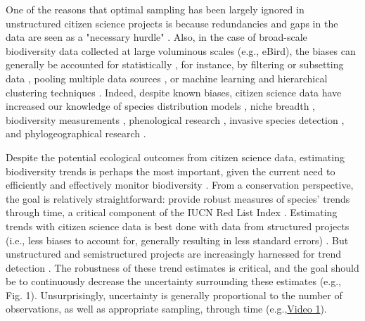 \documentclass[9pt,twocolumn,twoside,lineno]{pnas-new}
\begin{document}
One of the reasons that optimal sampling has been largely ignored in unstructured citizen science projects is because redundancies and gaps in the data are seen as a "necessary hurdle" \cite{parrish2018exposing}. Also, in the case of broad-scale biodiversity data collected at large voluminous scales (e.g., eBird), the biases can generally be accounted for statistically \cite{isaac2014statistics, robinson2018correcting}, for instance, by filtering or subsetting data \cite{wiggins2011conservation}, pooling multiple data sources \cite{fithian2015bias}, or machine learning and hierarchical clustering techniques \cite{hochachka2012data, kelling2015taking}. Indeed, despite known biases, citizen science data have increased our knowledge of species distribution models \cite{bradsworth2017species, van2013opportunistic}, niche breadth \cite{tiago2017using}, biodiversity measurements \cite{stuart2017assessing, pocock2018vision}, phenological research \cite{la2014role, supp2015citizen}, invasive species detection \cite{pocock2017citizen, grason2018citizen}, and phylogeographical research \cite{bahls2014new, drury2019continent}. 

Despite the potential ecological outcomes from citizen science data, estimating biodiversity trends is perhaps the most important, given the current need to efficiently and effectively monitor biodiversity \cite{harrison2014assessing, honrado2016fostering, yoccoz2001monitoring}. From a conservation perspective, the goal is relatively straightforward: provide robust measures of species' trends through time, a critical component of the IUCN Red List Index \cite{baillie2008toward}. Estimating trends with citizen science data is best done with data from structured projects (i.e., less biases to account for, generally resulting in less standard errors) \cite{fox2011new}. But unstructured and semistructured projects are increasingly harnessed for trend detection \cite{walker2017using, kery2009trend, kery2010site, horns2018using, van2013occupancy, pagel2014quantifying}. The robustness of these trend estimates is critical, and the goal should be to continuously decrease the uncertainty surrounding these estimates (e.g., Fig. 1). Unsurprisingly, uncertainty is generally proportional to the number of observations, as well as appropriate sampling, through time (e.g.,\href{https://github.com/coreytcallaghan/optimize_citizen_science_obs/blob/master/Figures/Noisy_miner_gif.gif}{Video 1}).
\end{document}
